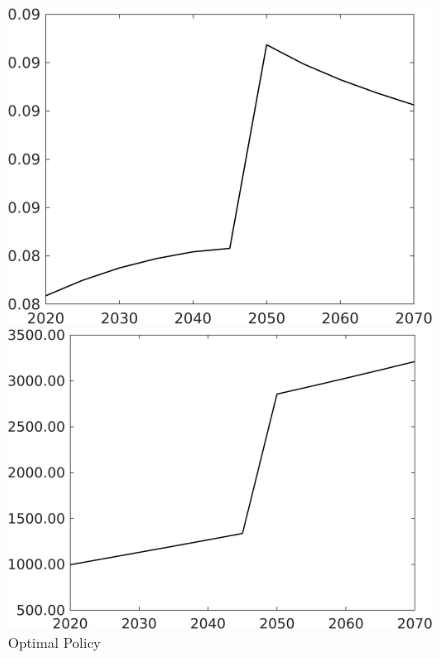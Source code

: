 \begin{figure}[h!!]
	\centering
	\caption{Optimal Policy }\label{fig:optPol}
	\begin{minipage}[]{0.32\textwidth}
		\includegraphics[width=1\textwidth]{../../codding_model/own_basedOnFried/optimalPol_010922_revision/figures/all_13Sept22_Tplus30/Single_OPT_T_NoTaus_taul_regime0_spillover0_knspil0_noskill0_sep0_xgrowth0_extern0_PV1_sizeequ0_GOV0_etaa0.79.png}
	\end{minipage}
	\begin{minipage}[]{0.32\textwidth}
		\includegraphics[width=1\textwidth]{../../codding_model/own_basedOnFried/optimalPol_010922_revision/figures/all_13Sept22_Tplus30/Single_OPT_T_NoTaus_Tauf_regime0_spillover0_knspil0_noskill0_sep0_xgrowth0_extern0_PV1_sizeequ0_GOV0_etaa0.79.png}

\end{minipage}
\end{figure}

